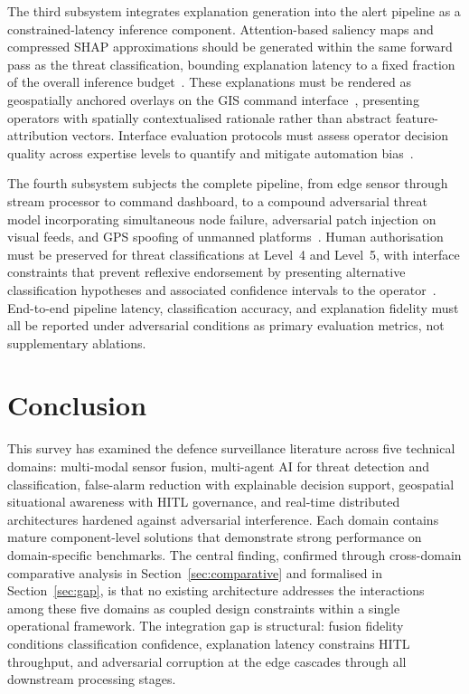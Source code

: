 The third subsystem integrates explanation generation into the alert pipeline as a constrained-latency inference component. Attention-based saliency maps and compressed SHAP approximations should be generated within the same forward pass as the threat classification, bounding explanation latency to a fixed fraction of the overall inference budget~\cite{military2024xai}. These explanations must be rendered as geospatially anchored overlays on the GIS command interface~\cite{karimipour2021iot}, presenting operators with spatially contextualised rationale rather than abstract feature-attribution vectors. Interface evaluation protocols must assess operator decision quality across expertise levels to quantify and mitigate automation bias~\cite{hitl2023trust, meaningful2024hitl}.

The fourth subsystem subjects the complete pipeline, from edge sensor through stream processor to command dashboard, to a compound adversarial threat model incorporating simultaneous node failure, adversarial patch injection on visual feeds, and GPS spoofing of unmanned platforms~\cite{flink2024kafka, advyolo2022, milai2025risk}. Human authorisation must be preserved for threat classifications at Level~4 and Level~5, with interface constraints that prevent reflexive endorsement by presenting alternative classification hypotheses and associated confidence intervals to the operator~\cite{meaningful2024hitl, autonomyteaming2024}. End-to-end pipeline latency, classification accuracy, and explanation fidelity must all be reported under adversarial conditions as primary evaluation metrics, not supplementary ablations.


\section{Conclusion}
\label{sec:conclusion}

This survey has examined the defence surveillance literature across five technical domains: multi-modal sensor fusion, multi-agent AI for threat detection and classification, false-alarm reduction with explainable decision support, geospatial situational awareness with HITL governance, and real-time distributed architectures hardened against adversarial interference. Each domain contains mature component-level solutions that demonstrate strong performance on domain-specific benchmarks. The central finding, confirmed through cross-domain comparative analysis in Section~\ref{sec:comparative} and formalised in Section~\ref{sec:gap}, is that no existing architecture addresses the interactions among these five domains as coupled design constraints within a single operational framework. The integration gap is structural: fusion fidelity conditions classification confidence, explanation latency constrains HITL throughput, and adversarial corruption at the edge cascades through all downstream processing stages.

